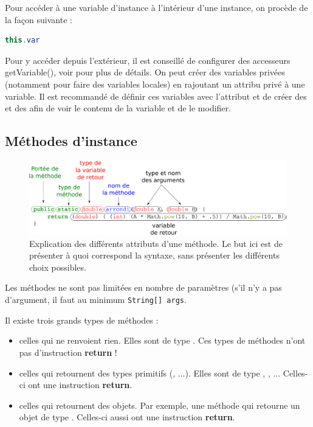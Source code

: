 \documentclass[a4paper,twoside]{article}
\begin{document}
Pour accéder à une variable d'instance à l'intérieur d'une instance, on procède de la façon suivante :
\begin{lstlisting}[language=java]
this.var
\end{lstlisting}

Pour y accéder depuis l'extérieur, il est conseillé de configurer des accesseurs \og getVariable()\fg, voir  pour plus de détails. On peut créer des variables privées (notamment pour faire des variables locales) en rajoutant un attribu privé à une variable. Il est recommandé de définir ces variables avec l'attribut  et de créer des  et des  afin de voir le contenu de la variable et de le modifier.

\subsection{Méthodes d'instance}\label{sec:methode_instance}

\begin{figure}[htb]
\centering
\includegraphics[width=\linewidth]{figures/method_scheme.pdf}
\caption{Explication des différents attributs d'une méthode. Le but ici est de présenter à quoi correspond la syntaxe, sans présenter les différents choix possibles.}
\end{figure}

Les méthodes ne sont pas limitées en nombre de paramètres (s'il n'y a pas d'argument, il faut au minimum \og \texttt{String[] args}\fg.

Il existe trois grands types de méthodes : 
\begin{itemize}
\item celles qui ne renvoient rien. Elles sont de type . Ces types de méthodes n'ont pas d'instruction \textbf{return} !
\item celles qui retournent des types primitifs (, ...). Elles sont de type , , ... Celles-ci ont une instruction \textbf{return}.
\item celles qui retournent des objets. Par exemple, une méthode qui retourne un objet de type . Celles-ci aussi ont une instruction \textbf{return}.
\end{itemize}
\end{document}
